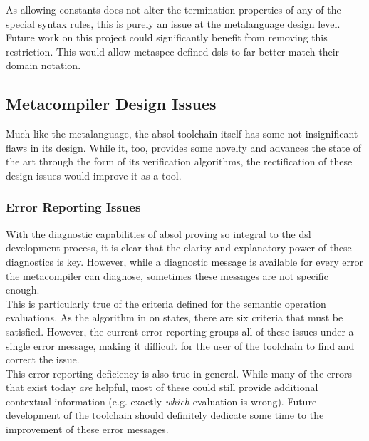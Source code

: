 As allowing constants does not alter the termination properties of any of the special syntax rules, this is purely an issue at the metalanguage design level.
Future work on this project could significantly benefit from removing this restriction.
This would allow \gls{metaspec}-defined \glspl{dsl} to far better match their domain notation.



\subsection{Metacompiler Design Issues} %
\label{sub:metacompiler_design_issues}
Much like the metalanguage, the \gls{absol} toolchain itself has some not-insignificant flaws in its design. 
While it, too, provides some novelty and advances the state of the art through the form of its verification algorithms, the rectification of these design issues would improve it as a tool.

\subsubsection{Error Reporting Issues} %
\label{ssub:error_reporting_issues}
With the diagnostic capabilities of \gls{absol} proving so integral to the \gls{dsl} development process, it is clear that the clarity and explanatory power of these diagnostics is key.
However, while a diagnostic message is available for every error the metacompiler can diagnose, sometimes these messages are not specific enough.\\

This is particularly true of the criteria defined for the semantic operation evaluations.
As the algorithm in  on  states, there are six criteria that must be satisfied.
However, the current error reporting groups all of these issues under a single error message, making it difficult for the user of the toolchain to find and correct the issue.\\

This error-reporting deficiency is also true in general.
While many of the errors that exist today \textit{are} helpful, most of these could still provide additional contextual information (e.g. exactly \textit{which} evaluation is wrong).
Future development of the toolchain should definitely dedicate some time to the improvement of these error messages.

